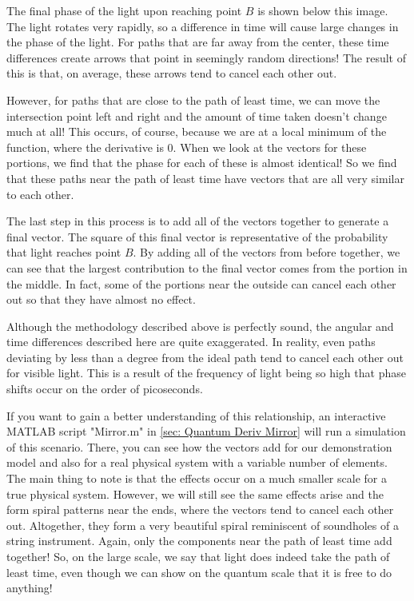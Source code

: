 The final phase of the light upon reaching point $B$ is shown below this image. The light rotates very rapidly, so a difference in time will cause large changes in the phase of the light. For paths that are far away from the center, these time differences create arrows that point in seemingly random directions! The result of this is that, on average, these arrows tend to cancel each other out.

However, for paths that are close to the path of least time, we can move the intersection point left and right and the amount of time taken doesn't change much at all! This occurs, of course, because we are at a local minimum of the function, where the derivative is 0. When we look at the vectors for these portions, we find that the phase for each of these is almost identical! So we find that these paths near the path of least time have vectors that are all very similar to each other.

The last step in this process is to add all of the vectors together to generate a final vector. The square of this final vector is representative of the probability that light reaches point $B$. By adding all of the vectors from before together, we can see that the largest contribution to the final vector comes from the portion in the middle. In fact, some of the portions near the outside can cancel each other out so that they have almost no effect.

Although the methodology described above is perfectly sound, the angular and time differences described here are quite exaggerated. In reality, even paths deviating by less than a degree from the ideal path tend to cancel each other out for visible light. This is a result of the frequency of light being so high that phase shifts occur on the order of picoseconds.

If you want to gain a better understanding of this relationship, an interactive MATLAB script "Mirror.m" in \autoref{sec: Quantum Deriv Mirror} will run a simulation of this scenario. There, you can see how the vectors add for our demonstration model and also for a real physical system with a variable number of elements. The main thing to note is that the effects occur on a much smaller scale for a true physical system. However, we will still see the same effects arise and the form spiral patterns near the ends, where the vectors tend to cancel each other out. Altogether, they form a very beautiful spiral reminiscent of soundholes of a string instrument. Again, only the components near the path of least time add together! So, on the large scale, we say that light does indeed take the path of least time, even though we can show on the quantum scale that it is free to do anything!

